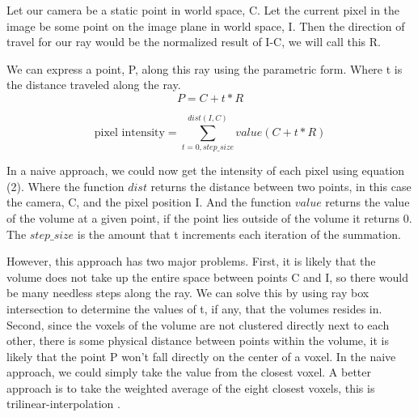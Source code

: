 \documentclass[11pt,twocolumn]{article}
\begin{document}
Let our camera be a static point in world space, C. 
Let the current pixel in the image be some point on the image plane in world space, I. 
Then the direction of travel for our ray would be the normalized result of I-C, we will call this R.

We can express a point, P, along this ray using the parametric form. Where t is the distance traveled along the ray.
\begin{equation}
  P = C + t * R
\end{equation}


\begin{equation}
  \text{pixel intensity} = \sum_{t=0,step\_size}^{dist(I,C)} value(C+t*R)
\end{equation}

In a naive approach, we could now get the intensity of each pixel using equation (2).
Where the function $dist$ returns the distance between two points, in this case the camera, C, and the pixel position I.
And the function $value$ returns the value of the volume at a given point, if the point lies outside of the volume it 
returns 0.
The $step\_size$ is the amount that t increments each iteration of the summation.

However, this approach has two major problems. 
First, it is likely that the volume does not take up the entire space between 
points C and I, so there would be many needless steps along the ray. We can solve this by using ray box intersection
to determine the values of t, if any, that the volumes resides in. Second, since the voxels of the volume are not 
clustered directly next to each other, there is some physical distance between points within the volume, it is likely 
that the point P won't fall directly on the center of a voxel. In the naive approach, we could simply take the value 
from the closest voxel. A better approach is to take the weighted average of the eight closest voxels, this is 
trilinear-interpolation \cite{Yoder_2003}.
\end{document}
